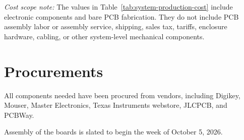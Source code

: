 \begin{weekthreechange}
    \textit{Cost scope note:} The values in Table~\ref{tab:system-production-cost}
    include electronic components and bare PCB fabrication. They do not include PCB
    assembly labor or assembly service, shipping, sales tax, tariffs, enclosure
    hardware, cabling, or other system-level mechanical components.

    \section{Procurements}
    All components needed have been procured from vendors, including Digikey, Mouser, Master Electronics, Texas Instruments webstore, JLCPCB, and PCBWay.

    Assembly of the boards is slated to begin the week of October 5, 2026.
\end{weekthreechange}
